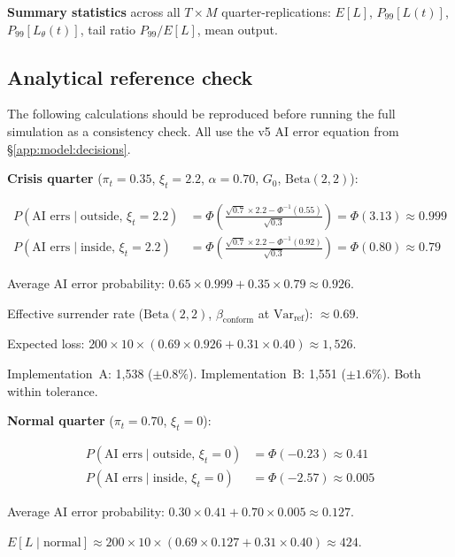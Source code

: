 \documentclass[11pt,a4paper]{article}
\begin{document}
\begin{appendices}
\textbf{Summary statistics} across all $T \times M$ quarter-replications:
$E[L]$, $P_{99}[L(t)]$, $P_{99}[L_\theta(t)]$, tail ratio $P_{99}/E[L]$,
mean output.

\subsection{Analytical reference check}\label{app:model:refcheck}

The following calculations should be reproduced before running the full
simulation as a consistency check. All use the v5 AI error equation from
\S\ref{app:model:decisions}.

\bigskip
\textbf{Crisis quarter}
($\pi_t = 0.35$, $\xi_t = 2.2$, $\alpha = 0.70$, $G_0$,
$\mathrm{Beta}(2,2)$):

\begin{align*}
P(\text{AI errs} \mid \text{outside},\, \xi_t{=}2.2)
  &= \Phi\!\left(
       \frac{\sqrt{0.7}\times 2.2 - \Phi^{-1}(0.55)}{\sqrt{0.3}}
     \right)
  = \Phi(3.13) \approx 0.999 \\[6pt]
P(\text{AI errs} \mid \text{inside},\, \xi_t{=}2.2)
  &= \Phi\!\left(
       \frac{\sqrt{0.7}\times 2.2 - \Phi^{-1}(0.92)}{\sqrt{0.3}}
     \right)
  = \Phi(0.80) \approx 0.79
\end{align*}

Average AI error probability:
$0.65 \times 0.999 + 0.35 \times 0.79 \approx 0.926$.

Effective surrender rate ($\mathrm{Beta}(2,2)$,
$\beta_{\text{conform}}$ at $\text{Var}_{\text{ref}}$):
$\approx 0.69$.

Expected loss:
$200 \times 10 \times (0.69 \times 0.926 + 0.31 \times 0.40)
\approx 1{,}526$.

\smallskip
Implementation~A: 1,538 ($\pm 0.8\%$).
Implementation~B: 1,551 ($\pm 1.6\%$).
Both within tolerance.

\bigskip
\textbf{Normal quarter}
($\pi_t = 0.70$, $\xi_t = 0$):

\begin{align*}
P(\text{AI errs} \mid \text{outside},\, \xi_t{=}0)
  &= \Phi(-0.23) \approx 0.41 \\[6pt]
P(\text{AI errs} \mid \text{inside},\, \xi_t{=}0)
  &= \Phi(-2.57) \approx 0.005
\end{align*}

Average AI error probability:
$0.30 \times 0.41 + 0.70 \times 0.005 \approx 0.127$.

$E[L \mid \text{normal}] \approx 200 \times 10 \times
(0.69 \times 0.127 + 0.31 \times 0.40) \approx 424$.


\end{appendices}
\end{document}
